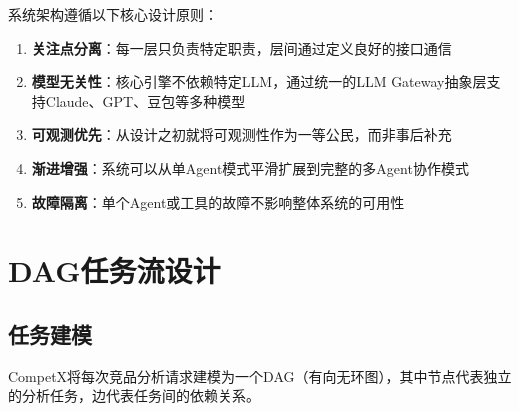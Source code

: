 \documentclass[12pt,a4paper]{ctexrep}
\begin{document}
系统架构遵循以下核心设计原则：

\begin{enumerate}[leftmargin=2em]
\item \textbf{关注点分离}：每一层只负责特定职责，层间通过定义良好的接口通信
\item \textbf{模型无关性}：核心引擎不依赖特定LLM，通过统一的LLM Gateway抽象层支持Claude、GPT、豆包等多种模型
\item \textbf{可观测优先}：从设计之初就将可观测性作为一等公民，而非事后补充
\item \textbf{渐进增强}：系统可以从单Agent模式平滑扩展到完整的多Agent协作模式
\item \textbf{故障隔离}：单个Agent或工具的故障不影响整体系统的可用性
\end{enumerate}

\section{DAG任务流设计}

\subsection{任务建模}

CompetX将每次竞品分析请求建模为一个DAG（有向无环图），其中节点代表独立的分析任务，边代表任务间的依赖关系。
\end{document}
